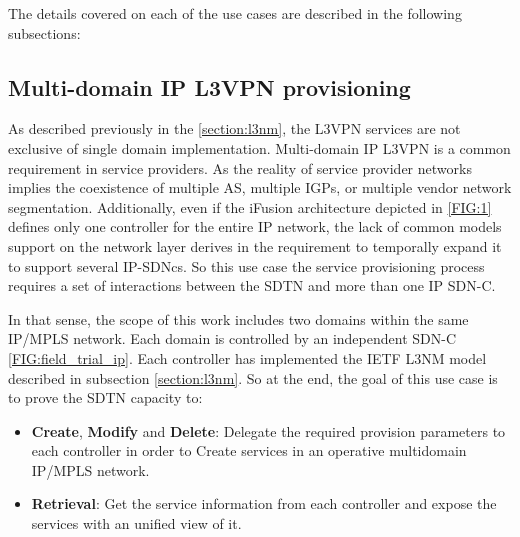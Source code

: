 \documentclass[a4paper,fleqn]{cas-dc}
\begin{document}
The details covered on each of the use cases are described in the following subsections:

\subsection{Multi-domain IP L3VPN provisioning}
\label{section:muli-l3nm}

As described previously in the \cref{section:l3nm}, the L3VPN services are not exclusive of single domain implementation. Multi-domain IP L3VPN is a common requirement in service providers. As the reality of service provider networks implies the coexistence of multiple AS, multiple IGPs, or multiple vendor network segmentation. Additionally, even if the iFusion architecture depicted in \ref{FIG:1} defines only one controller for the entire IP network, the lack of common models support on the network layer derives in the requirement to temporally expand it to support several IP-SDNcs. So this use case the service provisioning process requires a set of interactions between the SDTN and more than one IP SDN-C.

In that sense, the scope of this work includes two domains within the same IP/MPLS network. Each domain is controlled by an independent SDN-C \ref{FIG:field_trial_ip}. Each controller has implemented the IETF L3NM model described in subsection \cref{section:l3nm}. So at the end, the goal of this use case is to prove the SDTN capacity to:
\begin{itemize}
    \item \textbf{Create}, \textbf{Modify} and \textbf{Delete}: Delegate the required provision parameters to each controller in order to Create services in an operative multidomain IP/MPLS network.
    \item \textbf{Retrieval}: Get the service information from each controller and expose the services with an unified view of it.
\end{itemize}
\end{document}
